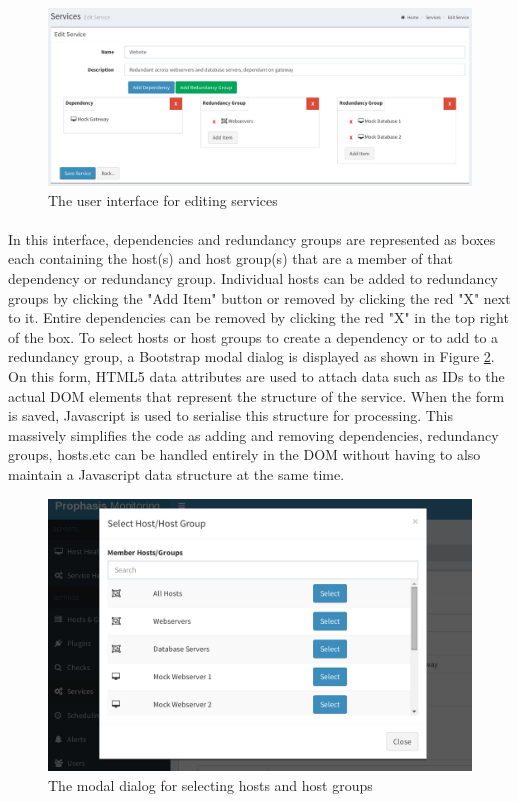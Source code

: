 \documentclass[bsc,logo,twoside]{infthesis}
\begin{document}
\begin{figure}[H]
	\centering
	\caption{The user interface for editing services}
	\label{edit-service}
	\includegraphics[scale=0.44]{assets/screenshots/edit-service.pdf}
\end{figure}

\paragraph*{}
	In this interface, dependencies and redundancy groups are represented as boxes
	each containing the host(s) and host group(s) that are a member of that
	dependency or redundancy group.  Individual hosts can be added to redundancy
	groups by clicking the "Add Item" button or removed by clicking the red "X"
	next to it.  Entire dependencies can be removed by clicking the red "X" in the
	top right of the box.  To select hosts or host groups to create a dependency
	or to add to a redundancy group, a Bootstrap modal dialog is displayed as
	shown in Figure \ref{edit-service-modal}.  On this form, HTML5 data attributes
	are used to attach data such as IDs to the actual DOM elements that represent
	the structure of the service.  When the form is saved, Javascript is used to
	serialise this structure for processing.  This massively simplifies the code
	as adding and removing dependencies, redundancy groups, hosts.etc can be
	handled entirely in the DOM without having to also maintain a Javascript data
	structure at the same time.
	
\begin{figure}[H]
	\centering
	\caption{The modal dialog for selecting hosts and host groups}
	\label{edit-service-modal}
	\includegraphics[scale=0.44]{assets/screenshots/edit-service-modal.pdf}
\end{figure}
\end{document}
